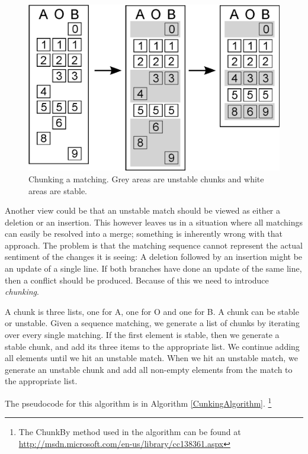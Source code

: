 \documentclass[11pt]{article}
\begin{document}
\begin{figure}
   \centerline{\includegraphics[scale=0.4]{drawings/eps/threewaymatching-chunking.eps}}
   \caption{Chunking a matching. Grey areas are unstable chunks and white areas are stable.}
   \label{Chunking}
\end{figure}

Another view could be that an unstable match should be viewed as either a deletion or an insertion. This however leaves us in a situation where all matchings can easily be resolved into a merge; something is inherently wrong with that approach. The problem is that the matching sequence cannot represent the actual sentiment of the changes it is seeing: A deletion followed by an insertion might be an update of a single line. If both branches have done an update of the same line, then a conflict should be produced. Because of this we need to introduce \textit{chunking}.

A chunk is three lists, one for A, one for O and one for B. A chunk can be stable or unstable. Given a sequence matching, we generate a list of chunks by iterating over every single matching. If the first element is stable, then we generate a stable chunk, and add its three items to the appropriate list. We continue adding all elements until we hit an unstable match. When we hit an unstable match, we generate an unstable chunk and add all non-empty elements from the match to the appropriate list.

The pseudocode for this algorithm is in Algorithm \ref{CunkingAlgorithm}. \footnote{The ChunkBy method used in the algorithm can be found at \url{http://msdn.microsoft.com/en-us/library/cc138361.aspx}}
\end{document}
